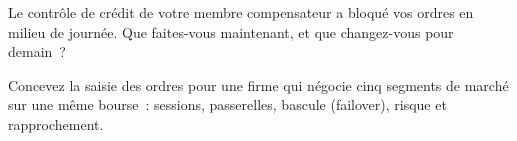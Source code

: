 \begin{interviewq}\label{iq:nw:futures-connectivity:5}
Le contrôle de crédit de votre membre compensateur a bloqué vos ordres en milieu de journée. Que faites-vous maintenant, et que changez-vous pour demain~?
\end{interviewq}

\begin{interviewq}\label{iq:nw:futures-connectivity:6}
Concevez la saisie des ordres pour une firme qui négocie cinq segments de marché sur une même bourse~: sessions, passerelles, bascule (failover), risque et rapprochement.
\end{interviewq}
